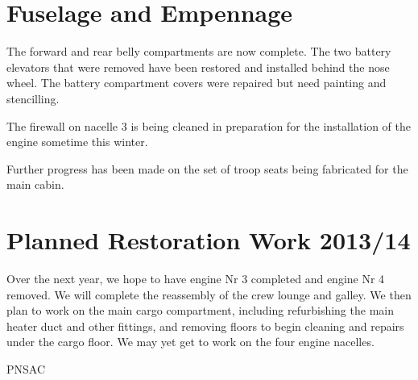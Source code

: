 \section{Fuselage and Empennage}
\label{empenage}

The forward and rear belly compartments are now complete.  The two
battery elevators that were removed have been restored and installed
behind the nose wheel.  The battery compartment covers were repaired
but need painting and stencilling.

The firewall on nacelle 3 is being cleaned in preparation for the
installation of the engine sometime this winter.

Further progress has been made on the set of troop seats being
fabricated for the main cabin.


\section{Planned Restoration Work 2013/14}
\label{sec:plannedwork}

Over the next year, we hope to have engine Nr 3 completed and engine
Nr 4 removed.  We will complete the reassembly of the crew lounge and
galley.  We then plan to work on the main cargo compartment, including
refurbishing the main heater duct and other fittings, and removing
floors to begin cleaning and repairs under the cargo floor.  We may
yet get to work on the four engine nacelles.



\begin{footnotesize}
  \raggedleft PNSAC\\
\end{footnotesize}




